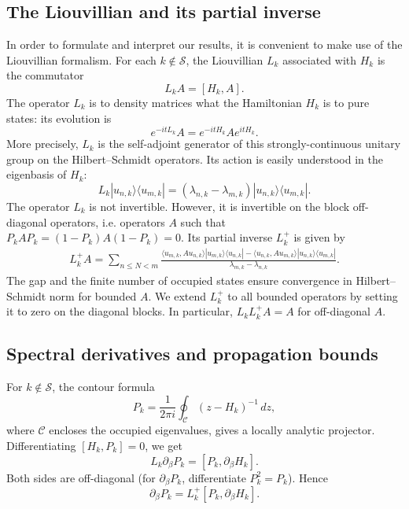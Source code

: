 \documentclass[a4paper,11pt]{article}
\theoremstyle{plain}
\theoremstyle{remark}
\begin{document}
\subsection{The Liouvillian and its partial inverse}
\label{sec:louvillian_intro}
In order to formulate and interpret our results, it is convenient to make use of the Liouvillian formalism. For each $k\notin\mathcal S$, the Liouvillian
$L_k$ associated with $H_k$ is the commutator
\begin{equation}\label{eq:Liouvillian}
L_k A=[H_k,A].
\end{equation}
The operator $L_k$ is to density matrices what the Hamiltonian $H_k$ is
to pure states: its evolution is
\begin{equation}\label{eq:Liouvillian2}
e^{-itL_k}A=e^{-itH_k}Ae^{itH_k}.
\end{equation}
More precisely, $L_k$ is the self-adjoint generator of this
strongly-continuous unitary group on the Hilbert--Schmidt operators.
Its action is easily understood in the eigenbasis of $H_k$:
\[
L_k|u_{n,k}\rangle\langle u_{m,k}|=
(\lambda_{n,k}-\lambda_{m,k})|u_{n,k}\rangle\langle u_{m,k}|.
\]
The operator $L_k$ is not invertible. However, it is invertible
on the block off-diagonal operators, i.e. operators $A$ such that
$P_kAP_k=(1-P_k)A(1-P_k)=0$. Its partial inverse $L_k^+$ is given by
\begin{align}\label{eq:explicit_inverse_liouvillian}
L_k^+A=\sum_{n\le N<m}
\frac{\langle u_{m,k},Au_{n,k}\rangle
 |u_{m,k}\rangle\langle u_{n,k}|
-\langle u_{n,k},Au_{m,k}\rangle
 |u_{n,k}\rangle\langle u_{m,k}|}
{\lambda_{m,k}-\lambda_{n,k}}.
\end{align}
The gap and the finite number of occupied states ensure convergence in
Hilbert--Schmidt norm for bounded $A$. We extend $L_k^+$ to all bounded
operators by setting it to zero on the diagonal blocks. In particular,
$L_kL_k^+A=A$ for off-diagonal $A$.

\subsection{Spectral derivatives and propagation bounds}
For $k\notin\mathcal S$, the contour formula
\begin{equation}\label{eq:int_rep}
P_k=\frac{1}{2\pi i}\oint_{\mathcal C}(z-H_k)^{-1}\,dz,
\end{equation}
where $\mathcal C$ encloses the occupied eigenvalues, gives a locally
analytic projector. Differentiating $[H_k,P_k]=0$, we get
\[
L_k\partial_\beta P_k=[P_k,\partial_\beta H_k].
\]
Both sides are off-diagonal (for $\partial_\beta P_k$, differentiate
$P_k^2=P_k$). Hence
\begin{equation}\label{eq:Pprime}
\partial_\beta P_k=L_k^+[P_k,\partial_\beta H_k].
\end{equation}
\end{document}
